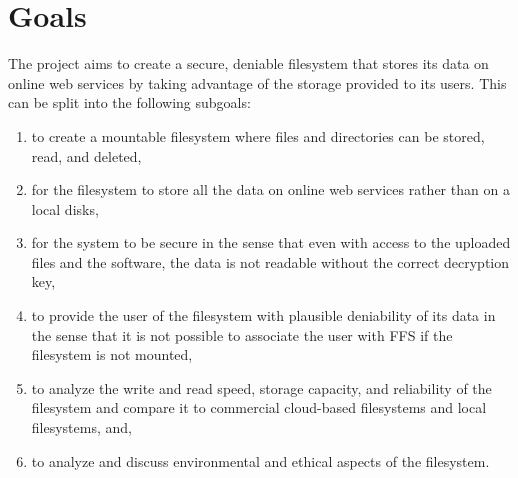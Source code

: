 
\section{Goals}


The project aims to create a secure, deniable filesystem that stores its data on online web services by taking advantage of the storage provided to its users. This can be split into the following subgoals:
\begin{enumerate}
\item to create a mountable filesystem where files and directories can be stored, read, and deleted,
\item for the filesystem to store all the data on online web services rather than on a local disks,
\item for the system to be secure in the sense that even with access to the uploaded files and the software, the data is not readable without the correct decryption key, 
\item to provide the user of the filesystem with plausible deniability of its data in the sense that it is not possible to associate the user with FFS if the filesystem is not mounted,
\item to analyze the write and read speed, storage capacity, and reliability of the filesystem and compare it to commercial cloud-based filesystems and local filesystems, and,
\item to analyze and discuss environmental and ethical aspects of the filesystem.
\end{enumerate}

